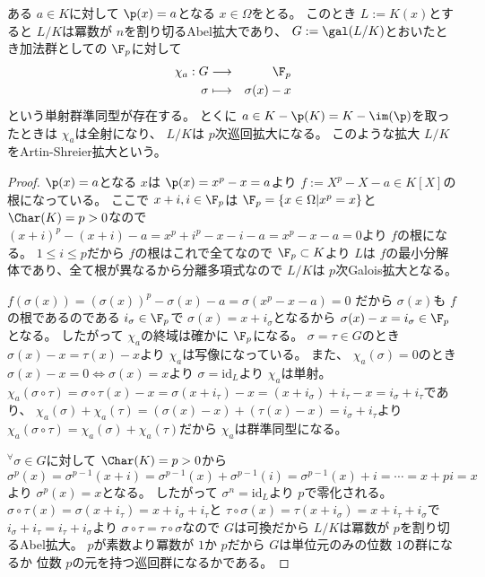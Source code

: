 \documentclass[../master_galois_theory]{subfiles}
\begin{document}
\begin{prop} \label{prop:artinshreier}
  ある $a \in K$に対して $\p(x) = a$となる $x \in \Omega$をとる。
  このとき $L := K(x)$とすると $L/K$は冪数が $n$を割り切る\rm{Abel}拡大であり、
  $G := \gal(L/K)$とおいたとき加法群としての $\F_p$に対して
  \begin{eqnarray*}
    \chi_a : G & \longrightarrow & \F_p \\
    \sigma & \longmapsto & \sigma(x) - x
  \end{eqnarray*}
  という単射群準同型が存在する。
  とくに $a \in K - \p(K) = K - \im(\p)$を取ったときは
  $\chi_a$は全射になり、 $L/K$は $p$次巡回拡大になる。
  このような拡大 $L/K$を\rm{Artin-Shreier}拡大という。
\end{prop}

\begin{proof}
  $\p(x) = a$となる $x$は $\p(x) = x^p - x = a$より $ f := X^p - X - a \in K[X]$の根になっている。
  ここで $x + i , i \in \F_p$は $\F_p = \{ x \in \Omega | x^p = x \}$と
  $\Char(K) = p > 0$なので
  $(x + i)^p - (x + i) - a = x^p + i^p - x - i - a = x^p - x - a = 0$より
  $f$の根になる。
  $1 \leq i \leq p$だから $f$の根はこれで全てなので $\F_p \subset K$より
  $L$は $f$の最小分解体であり、全て根が異なるから分離多項式なので
  $L/K$は $p$次\rm{Galois}拡大となる。

  $f(\sigma(x)) = (\sigma(x))^p - \sigma(x) - a = \sigma(x^p - x - a) = 0$
  だから $\sigma(x)$も $f$の根であるのである $i_\sigma \in \F_p$で
  $\sigma(x) = x + i_\sigma$となるから $\sigma(x) - x = i_\sigma \in \F_p$となる。
  したがって $\chi_a$の終域は確かに $\F_p$になる。
  $\sigma = \tau \in G$のとき $\sigma(x) - x = \tau(x) - x$より
  $\chi_a$は写像になっている。
  また、 $\chi_a(\sigma) = 0$のとき $\sigma(x) - x = 0 \Leftrightarrow \sigma(x) = x$より $\sigma = \mathrm{id}_L$より $\chi_a$は単射。
  $\chi_a(\sigma \circ \tau) = \sigma \circ \tau(x) - x = \sigma(x + i_\tau) - x = (x + i_\sigma) + i_\tau - x = i_\sigma + i_\tau$であり、
  $\chi_a(\sigma) + \chi_a(\tau) = (\sigma(x) - x) + (\tau(x) - x) = i_\sigma + i_\tau$より $\chi_a(\sigma \circ \tau) = \chi_a(\sigma) + \chi_a(\tau)$だから $\chi_a$は群準同型になる。

  ${}^\forall \sigma \in G$に対して $\Char(K) = p > 0$から
  $\sigma^p(x) = \sigma^{p-1}(x + i) = \sigma^{p-1}(x) + \sigma^{p-1}(i) = \sigma^{p-1}(x) + i = \cdots = x + pi = x$より $\sigma^p(x) = x$となる。
  したがって $\sigma^n = \mathrm{id}_L$より $p$で零化される。
  $\sigma \circ \tau(x) = \sigma(x + i_\tau) = x + i_\sigma + i_\tau$と
  $\tau \circ \sigma(x) = \tau(x + i_\sigma) = x + i_\tau + i_\sigma$で
  $i_\sigma + i_\tau = i_\tau + i_\sigma$より $\sigma \circ \tau = \tau \circ \sigma$なので $G$は可換だから $L/K$は冪数が $p$を割り切る\rm{Abel}拡大。
  $p$が素数より冪数が $1$か $p$だから $G$は単位元のみの位数 $1$の群になるか
  位数 $p$の元を持つ巡回群になるかである。


\end{proof}
\end{document}
